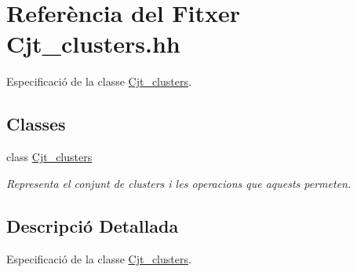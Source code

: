 \hypertarget{_cjt__clusters_8hh}{}\section{Referència del Fitxer Cjt\+\_\+clusters.\+hh}
\label{_cjt__clusters_8hh}


Especificació de la classe \hyperlink{class_cjt__clusters}{Cjt\+\_\+clusters}.  


\subsection*{Classes}
\begin{DoxyCompactItemize}
\item 
class \hyperlink{class_cjt__clusters}{Cjt\+\_\+clusters}
\begin{DoxyCompactList}\small\item\em Representa el conjunt de clusters i les operacions que aquests permeten. \end{DoxyCompactList}\end{DoxyCompactItemize}


\subsection{Descripció Detallada}
Especificació de la classe \hyperlink{class_cjt__clusters}{Cjt\+\_\+clusters}. 

